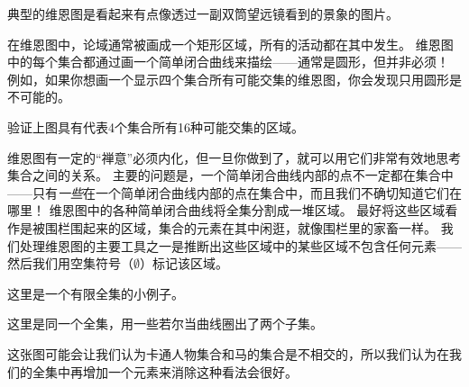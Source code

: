 典型的维恩图是看起来有点像透过一副双筒望远镜看到的景象的图片。
\vspace{.1in}



\vspace{.1in}

在维恩图中，论域通常被画成一个矩形区域，所有的活动都在其中发生。
维恩图中的每个集合都通过画一个简单闭合曲线来描绘——通常是圆形，但并非必须！
例如，如果你想画一个显示四个集合所有可能交集的维恩图，你会发现只用圆形是不可能的。
\vspace{.1in}



\vspace{.1in}

\begin{exer}
验证上图具有代表4个集合所有16种可能交集的区域。
\end{exer}

维恩图有一定的“禅意”必须内化，但一旦你做到了，就可以用它们非常有效地思考集合之间的关系。
主要的问题是，一个简单闭合曲线内部的点不一定都在集合中——只有\emph{一些}在一个简单闭合曲线内部的点在集合中，而且我们不确切知道它们在哪里！
维恩图中的各种简单闭合曲线将全集分割成一堆区域。
最好将这些区域看作是被围栏围起来的区域，集合的元素在其中闲逛，就像围栏里的家畜一样。
我们处理维恩图的主要工具之一是推断出这些区域中的某些区域不包含任何元素——然后我们用空集符号（$\emptyset$）标记该区域。

这里是一个有限全集的小例子。

\vspace{.1in}



\vspace{.1in}

\noindent 这里是同一个全集，用一些若尔当曲线圈出了两个子集。
\vspace{.1in}



\vspace{.1in}

这张图可能会让我们认为卡通人物集合和马的集合是不相交的，所以我们认为在我们的全集中再增加一个元素来消除这种看法会很好。
\vspace{.1in}



\vspace{.1in}


